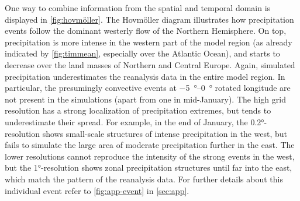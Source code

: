 One way to combine information from the spatial and temporal domain is displayed in \cref{fig:hovmöller}. The Hovmöller diagram illustrates how precipitation events follow the dominant westerly flow of the Northern Hemisphere. On top, precipitation is more intense in the western part of the model region (as already indicated by \cref{fig:timmean}, especially over the Atlantic Ocean), and starts to decrease over the land masses of Northern and Central Europe. Again, simulated precipitation underestimates the reanalysis data in the entire model region. In particular, the presumingly convective events at \SIrange{-5}{0}{°} rotated longitude are not present in the simulations (apart from one in mid-January).
The high grid resolution has a strong localization of precipitation extremes, but tends to underestimate their spread. For example, in the end of January, the 0.2°-resolution shows small-scale structures of intense precipitation in the west, but fails to simulate the large area of moderate precipitation further in the east. The lower resolutions cannot reproduce the intensity of the strong events in the west, but the 1°-resolution shows zonal precipitation structures until far into the east, which match the pattern of the reanalysis data. For further details about this individual event refer to \cref{fig:app-event} in \cref{sec:app}.